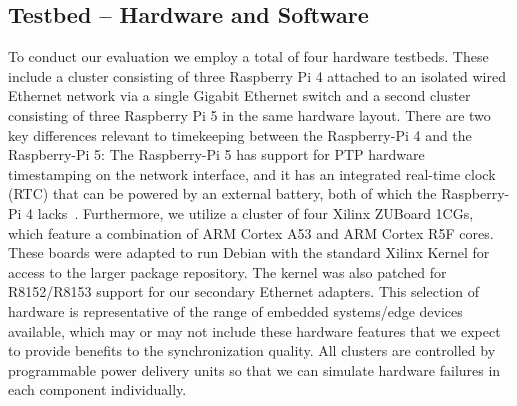 

\subsection{Testbed -- Hardware and Software}

To conduct our evaluation we employ a total of four hardware testbeds. These include a cluster consisting of three Raspberry Pi 4 attached to an isolated wired Ethernet network via a single Gigabit Ethernet switch and a second cluster consisting of three Raspberry Pi 5 in the same hardware layout. There are two key differences relevant to timekeeping between the Raspberry-Pi 4 and the Raspberry-Pi 5: The Raspberry-Pi 5 has support for PTP hardware timestamping on the network interface, and it has an integrated real-time clock (RTC) that can be powered by an external battery, both of which the Raspberry-Pi 4 lacks~\cite{raspberry-pi-datasheets}. Furthermore, we utilize a cluster of four Xilinx ZUBoard 1CGs, which feature a combination of ARM Cortex A53 and ARM Cortex R5F cores. These boards were adapted to run Debian with the standard Xilinx Kernel for access to the larger package repository. The kernel was also patched for R8152/R8153 support for our secondary Ethernet adapters. This selection of hardware is representative of the range of embedded systems/edge devices available, which may or may not include these hardware features that we expect to provide benefits to the synchronization quality. All clusters are controlled by programmable power delivery units so that we can simulate hardware failures in each component individually.

